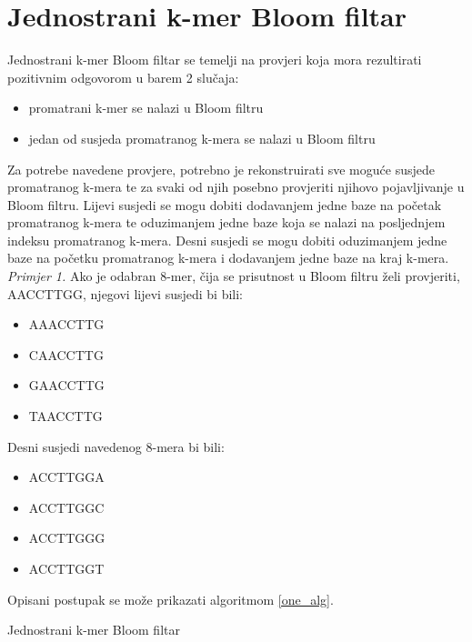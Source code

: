 \documentclass[times, utf8, seminar, numeric]{fer}
\begin{document}
\section{Jednostrani k-mer Bloom filtar}
Jednostrani k-mer Bloom filtar se temelji na provjeri koja mora rezultirati
pozitivnim odgovorom u barem 2 slučaja:
\begin{itemize}
  \item{promatrani k-mer se nalazi u Bloom filtru}
  \item{jedan od susjeda promatranog k-mera se nalazi u Bloom filtru}
\end{itemize}
Za potrebe navedene provjere, potrebno je rekonstruirati sve moguće susjede
promatranog k-mera te za svaki od njih posebno provjeriti njihovo pojavljivanje
u Bloom filtru. Lijevi susjedi se mogu dobiti dodavanjem jedne baze na početak
promatranog k-mera te oduzimanjem jedne baze koja se nalazi na posljednjem indeksu
promatranog k-mera. Desni susjedi se mogu dobiti oduzimanjem jedne baze na početku
promatranog k-mera i dodavanjem jedne baze na kraj k-mera.\\
\textit{Primjer 1.} Ako je odabran 8-mer, čija se prisutnost u Bloom filtru želi
provjeriti, AACCTTGG, njegovi lijevi susjedi bi bili:
\begin{itemize}
  \item{AAACCTTG}
  \item{CAACCTTG}
  \item{GAACCTTG}
  \item{TAACCTTG}
\end{itemize}
Desni susjedi navedenog 8-mera bi bili:
\begin{itemize}
  \item{ACCTTGGA}
  \item{ACCTTGGC}
  \item{ACCTTGGG}
  \item{ACCTTGGT}
\end{itemize}
Opisani postupak se može prikazati algoritmom \ref{one_alg}.

\begin{algorithm}[H]
  \caption{Jednostrani k-mer Bloom filtar \cite{kbf}}
  \label{one_alg}
  \begin{algorithmic}[1]
      \EndIf
    \EndFunction\\
        \EndIf
      \EndFor
    \EndFunction
  \end{algorithmic}
\end{algorithm}
\end{document}
